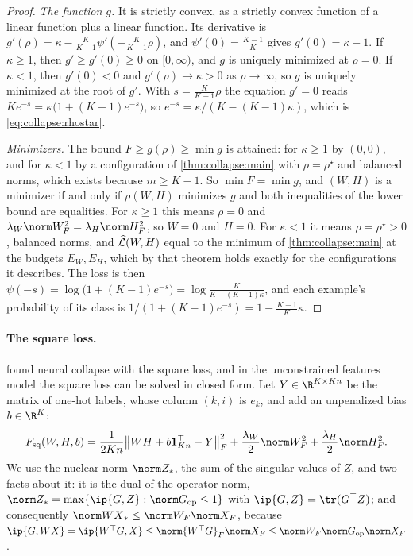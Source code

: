 \begin{refsection}
\begin{proof}
\emph{The function $g$.} It is strictly convex, as a strictly convex function of a linear function plus a linear function. Its derivative is $g'(\rho)=\kappa-\frac K{K-1}\psi'(-\frac K{K-1}\rho)$, and $\psi'(0)=\frac{K-1}K$ gives $g'(0)=\kappa-1$. If $\kappa\ge1$, then $g'\ge g'(0)\ge0$ on $[0,\infty)$, and $g$ is uniquely minimized at $\rho=0$. If $\kappa<1$, then $g'(0)<0$ and $g'(\rho)\to\kappa>0$ as $\rho\to\infty$, so $g$ is uniquely minimized at the root of $g'$. With $s=\frac K{K-1}\rho$ the equation $g'=0$ reads $Ke^{-s}=\kappa\bigl(1+(K-1)e^{-s}\bigr)$, so $e^{-s}=\kappa/(K-(K-1)\kappa)$, which is \eqref{eq:collapse:rhostar}.

\emph{Minimizers.} The bound $F\ge g(\rho)\ge\min g$ is attained: for $\kappa\ge1$ by $(0,0)$, and for $\kappa<1$ by a configuration of \cref{thm:collapse:main} with $\rho=\rho^\star$ and balanced norms, which exists because $m\ge K-1$. So $\min F=\min g$, and $(W,H)$ is a minimizer if and only if $\rho(W,H)$ minimizes $g$ and both inequalities of the lower bound are equalities. For $\kappa\ge1$ this means $\rho=0$ and $\lambda_W\norm W_F^2=\lambda_H\norm H_F^2$, so $W=0$ and $H=0$. For $\kappa<1$ it means $\rho=\rho^\star>0$, balanced norms, and $\widehat{\mathcal{L}}(W,H)$ equal to the minimum of \cref{thm:collapse:main} at the budgets $E_W,E_H$, which by that theorem holds exactly for the configurations it describes. The loss is then $\psi(-s)=\log\bigl(1+(K-1)e^{-s}\bigr)=\log\frac K{K-(K-1)\kappa}$, and each example's probability of its class is $1/(1+(K-1)e^{-s})=1-\frac{K-1}K\kappa$.
\end{proof}

\paragraph{The square loss.} \Textcite{HanPapyanDonoho2022} found neural collapse with the square loss, and in the unconstrained features model the square loss can be solved in closed form. Let $Y\in\R^{K\times Kn}$ be the matrix of one-hot labels, whose column $(k,i)$ is $e_k$, and add an unpenalized bias $b\in\R^K$:
\begin{equation}\label{eq:collapse:mse}
  F_{\mathrm{sq}}(W,H,b)=\frac1{2Kn}\bigl\|WH+b\collapseone_{Kn}^\top-Y\bigr\|_F^2+\frac{\lambda_W}2\norm W_F^2+\frac{\lambda_H}2\norm H_F^2 .
\end{equation}
We use the nuclear norm $\collapsenuc Z$, the sum of the singular values of $Z$, and two facts about it: it is the dual of the operator norm, $\collapsenuc Z=\max\{\ip{G,Z}:\norm G_{\op}\le1\}$ with $\ip{G,Z}=\tr(G^\top Z)$; and consequently $\collapsenuc{WX}\le\norm W_F\norm X_F$, because $\ip{G,WX}=\ip{W^\top G,X}\le\norm{W^\top G}_F\norm X_F\le\norm W_F\norm G_{\op}\norm X_F$.


\end{refsection}
